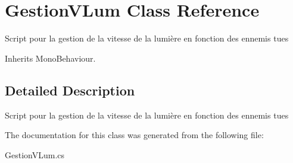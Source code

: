\hypertarget{class_gestion_v_lum}{\section{Gestion\+V\+Lum Class Reference}
\label{class_gestion_v_lum}
}


Script pour la gestion de la vitesse de la lumière en fonction des ennemis tues  




Inherits Mono\+Behaviour.



\subsection{Detailed Description}
Script pour la gestion de la vitesse de la lumière en fonction des ennemis tues 



The documentation for this class was generated from the following file\+:\begin{DoxyCompactItemize}
\item 
Gestion\+V\+Lum.\+cs\end{DoxyCompactItemize}
